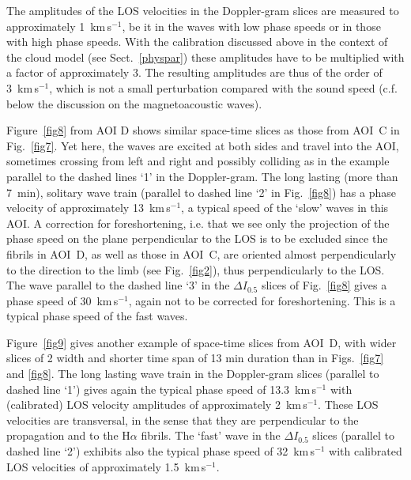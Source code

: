 The amplitudes of the LOS velocities in the Doppler-gram slices are measured to approximately 1~km\,s$^{-1}$, be it in the waves with low phase speeds or in those with high phase speeds. With the calibration discussed above in the context of the cloud model (see Sect.~\ref{physpar}) these amplitudes have to be multiplied with a factor of approximately 3. The resulting {amplitudes} are thus of the order of 3~km\,s$^{-1}$, which is not a small perturbation compared with the sound speed (c.f. below the discussion on the magnetoacoustic waves).


Figure~\ref{fig8} from AOI D shows similar space-time slices as those from
AOI~C in Fig.~\ref{fig7}. Yet here, the waves are excited at both sides and
travel into the AOI, {sometimes} crossing from left and right
and possibly colliding as in {the example} parallel to the dashed lines `1' in
the Doppler-gram. The long lasting (more than 7~min), solitary wave train
(parallel to dashed line `2' in Fig.~\ref{fig8}) has a phase velocity of
approximately 13~km\,s$^{-1}$, a typical speed of the `slow' waves in this
AOI. A correction for foreshortening, i.e. that we see only the projection of
the phase speed on the plane perpendicular to the LOS is to be excluded since
the fibrils in AOI~D, as well as those in AOI~C, are oriented almost perpendicularly to the direction to the limb (see Fig.~\ref{fig2}), thus perpendicularly to the LOS. The wave parallel to the dashed line `3' in the $\Delta I_{0.5}$ slices of Fig.~\ref{fig8} gives a phase speed of 30~km\,s$^{-1}$, again not to be corrected for foreshortening. This is a typical phase speed of the fast waves. 





Figure~\ref{fig9} gives another example of space-time slices from AOI~D, with wider slices of 2 width and shorter time span of 13 min duration than in Figs.~\ref{fig7} and \ref{fig8}. The long lasting wave train in the Doppler-gram slices (parallel to dashed line `1') gives again the typical phase speed of 13.3~km\,s$^{-1}$ with (calibrated) LOS velocity amplitudes of approximately 2~km\,s$^{-1}$. These LOS velocities are transversal, in the sense that they are perpendicular to the propagation and to the H$\alpha$ fibrils. The `fast' wave in the $\Delta I_{0.5}$ slices (parallel to dashed line `2') exhibits also the typical phase speed of 32~km\,s$^{-1}$ with calibrated LOS velocities of approximately 1.5~km\,s$^{-1}$. 




